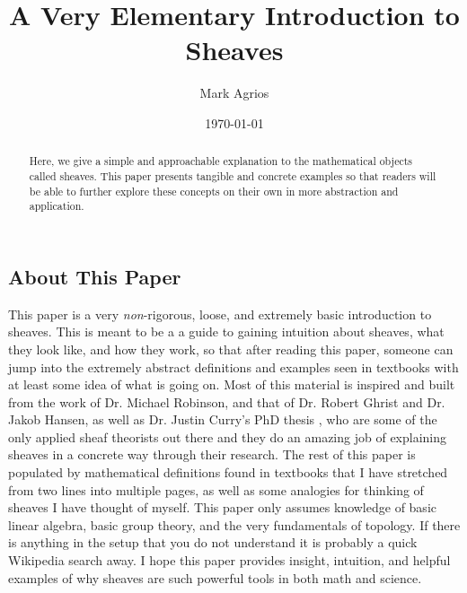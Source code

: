 \documentclass{tufte-handout}
\title{A Very Elementary Introduction to Sheaves}
\author{Mark Agrios}
\date{\today}
\begin{document}
\maketitle%

\begin{abstract}
\noindent Here, we give a simple and approachable explanation to the mathematical objects called sheaves. This paper presents tangible and concrete examples so that readers will be able to further explore these concepts on their own in more abstraction and application.
\end{abstract}



\subsection{About This Paper}
This paper is a very \emph{non}-rigorous, loose, and extremely basic introduction to sheaves. This is meant to be a a guide to gaining intuition about sheaves, what they look like, and how they work, so that after reading this paper, someone can jump into the extremely abstract definitions and examples seen in textbooks with at least some idea of what is going on. Most of this material is inspired and built from the work of Dr. Michael Robinson\cite[-40pt]{robinsonTSP}\cite[-18pt]{robinsonPOSET}\cite{robinsonSheaf}, and that of Dr. Robert Ghrist and Dr. Jakob Hansen\cite{hansengentle}\cite{hansen2019learning}, as well as Dr. Justin Curry's PhD thesis%
\cite{Curry},
who are some of the only applied sheaf theorists out there and they do an amazing job of explaining sheaves in a concrete way through their research. The rest of this paper is populated by mathematical definitions found in textbooks that I have stretched from two lines into multiple pages, as well as some analogies for thinking of sheaves I have thought of myself. This paper only assumes knowledge of basic linear algebra, basic group theory, and the very fundamentals of topology. If there is anything in the setup that you do not understand it is probably a quick Wikipedia search away. I hope this paper provides insight, intuition, and helpful examples of why sheaves are such powerful tools in both math and science.
\end{document}
